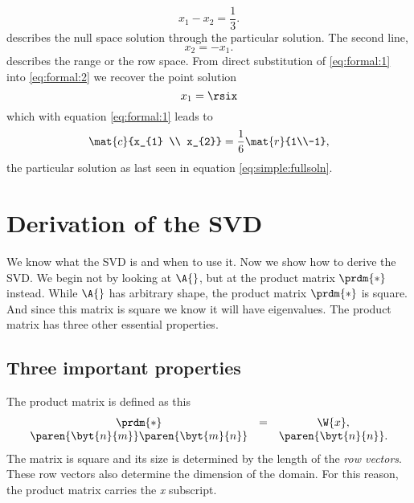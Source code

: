 \begin{equation}
  x_{1} - x_{2} = \frac{1}{3}.
\label{eq:formal:2}
\end{equation}
describes the null space solution through the particular solution. The second line,
\begin{equation}
x_{2}=-x_{1}.
\label{eq:formal:1}
\end{equation}
describes the range or the row space.
From direct substitution of \eqref{eq:formal:1} into \eqref{eq:formal:2} we recover the point solution
\begin{equation}
  x_{1} = \rsix
\end{equation}
which with equation \eqref{eq:formal:1} leads to
\begin{equation}
  \mat{c}{x_{1} \\ x_{2}} = \frac{1}{6}\mat{r}{1\\-1},
\end{equation}
the particular solution as last seen in equation \eqref{eq:simple:fullsoln}.

%
%

\section{Derivation of the SVD}

We know what the SVD is and when to use it. Now we show how to derive the SVD. We begin not by looking at $\A{}$, but at the product matrix $\prdm{*}$  instead. While $\A{}$ has arbitrary shape, the product matrix  $\prdm{*}$  is square. And since this matrix is square we know it will have eigenvalues. The product matrix has three other essential properties.


\subsection{Three important properties}
The product matrix is defined as this
\begin{equation}
\begin{array}{ccc}
  \prdm{*} &=& \W{x},\\
  \paren{\byt{n}{m}}\paren{\byt{m}{n}} && \paren{\byt{n}{n}}.
\end{array}
\end{equation}
The matrix is square and its size is determined by the length of the \textit{row vectors}. These row vectors also determine the dimension of the domain. For this reason, the product matrix carries the \textit{x} subscript.

